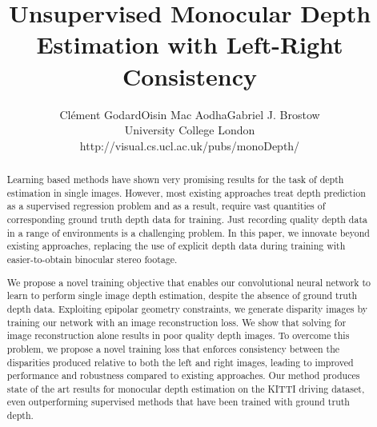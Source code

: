 \documentclass[10pt,twocolumn,letterpaper]{article}
\begin{document}
\title{Unsupervised Monocular Depth Estimation with Left-Right Consistency}

\author{Cl\'{e}ment Godard\hspace{40pt}Oisin Mac Aodha\hspace{40pt}Gabriel J. Brostow\\
University College London\\
http://visual.cs.ucl.ac.uk/pubs/monoDepth/
}

\maketitle

\begin{abstract}
Learning based methods have shown very promising results for the task of depth estimation in single images.
However, most existing approaches treat depth prediction as a supervised regression problem and as a result, require vast quantities of corresponding ground truth depth data for training.
Just recording quality depth data in a range of  environments is a challenging problem. 
In this paper, we innovate beyond existing approaches, replacing the use of explicit depth data during training with easier-to-obtain binocular stereo footage.

We propose a novel training objective that enables our convolutional neural network to learn to perform single image depth estimation, despite the absence of ground truth depth data.
Exploiting epipolar geometry constraints, we generate disparity images by training our network with an image reconstruction loss.
We show that solving for image reconstruction alone results in poor quality depth images. 
To overcome this problem, we propose a novel training loss that enforces consistency between the disparities produced relative to both the left and right images, leading to improved performance and robustness compared to existing approaches. 
Our method produces state of the art results for monocular depth estimation on the KITTI driving dataset, even outperforming supervised methods that have been trained with ground truth depth. 
\end{abstract}
\end{document}
